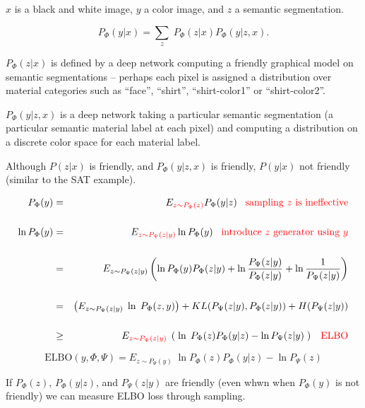 {$x$ is a black and white image, $y$ a color image, and $z$ a semantic segmentation.

\vfill
$$P_\Phi(y|x) = \sum_z\;P_\Phi(z|x)P_\Phi(y|z,x).$$


$P_\Phi(z|x)$ is defined by a deep network computing a friendly graphical model on semantic segmentations --
perhaps each pixel is assigned a distribution over material categories such as ``face'', ``shirt'', ``shirt-color1'' or ``shirt-color2''.

\vfill
$P_\Phi(y|z,x)$ is a deep network taking a particular semantic segmentation (a particular semantic material label at each pixel) and computing
a distribution on a discrete color space for each material label.

\vfill
Although $P(z|x)$ is friendly, and $P_\Phi(y|z,x)$ is friendly, $P(y|x)$ not friendly (similar to the SAT example).


\vfill
{\huge
\begin{eqnarray*}
P_\Phi(y) & = & E_{\color{red} z \sim P_\Phi(z)}P_\Phi(y|z) \;\;\;\mbox{\color{red} sampling $z$ is ineffective}\\
\\
\ln P_\Phi(y) & = & E_{\color{red} z \sim P_\Psi(z|y)} \ln P_\Phi(y) \;\;\;\mbox{\color{red} introduce $z$ generator using $y$}\\
\\
 & = & E_{z \sim P_\Psi(z|y)} \left(\ln P_\Phi(y)P_\Phi(z|y) + \ln \frac{P_\Psi(z|y)}{P_\Phi(z|y)} + \ln\frac{1}{P_\Psi(z|y)}\right) \\
 \\
 & = & \left(E_{z \sim P_\Psi(z|y)} \;\ln\;P_\Phi(z,y)\right) + KL(P_\Psi(z|y),P_\Phi(z|y)) + H(P_\Psi(z|y)) \\
 \\
 & \geq & E_{\color{red} z \sim P_\Psi(z|y)}\;\left(\;\ln\;P_\Phi(z)P_\Phi(y|z) - \ln P_\Psi(z|y)\;\right) \;\;\;\mbox{\color{red} ELBO}
\end{eqnarray*}
}


\vfill
{\color{red} $$\mathrm{ELBO}(y,\Phi,\Psi)  = E_{z\sim P_\Psi(y)} \; \ln P_\Phi(z)P_\Phi(y|z) - \ln P_\Psi(z)$$}

\vfill
If $P_\Phi(z)$, $P_\Phi(y|z)$, and $P_\Psi(z|y)$ are friendly (even whwn when $P_\Phi(y)$ is not friendly) we can
measure ELBO loss through sampling.

}
